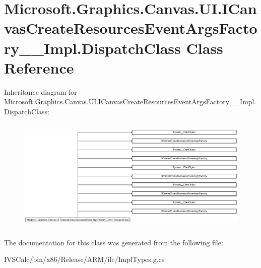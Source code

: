 \hypertarget{class_microsoft_1_1_graphics_1_1_canvas_1_1_u_i_1_1_i_canvas_create_resources_event_args_factory_____impl_1_1_dispatch_class}{}\section{Microsoft.\+Graphics.\+Canvas.\+U\+I.\+I\+Canvas\+Create\+Resources\+Event\+Args\+Factory\+\_\+\+\_\+\+Impl.\+Dispatch\+Class Class Reference}
\label{class_microsoft_1_1_graphics_1_1_canvas_1_1_u_i_1_1_i_canvas_create_resources_event_args_factory_____impl_1_1_dispatch_class}
Inheritance diagram for Microsoft.\+Graphics.\+Canvas.\+U\+I.\+I\+Canvas\+Create\+Resources\+Event\+Args\+Factory\+\_\+\+\_\+\+Impl.\+Dispatch\+Class\+:\begin{figure}[H]
\begin{center}
\leavevmode
\includegraphics[height=5.490196cm]{class_microsoft_1_1_graphics_1_1_canvas_1_1_u_i_1_1_i_canvas_create_resources_event_args_factory_____impl_1_1_dispatch_class}
\end{center}
\end{figure}


The documentation for this class was generated from the following file\+:\begin{DoxyCompactItemize}
\item 
I\+V\+S\+Calc/bin/x86/\+Release/\+A\+R\+M/ilc/Impl\+Types.\+g.\+cs\end{DoxyCompactItemize}
